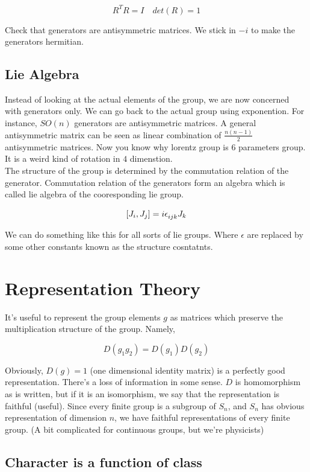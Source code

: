 \documentclass{report}
\begin{document}
$$R^{T}R = I \quad det(R) = 1$$

\noindent Check that generators are antisymmetric matrices. We stick in $-i$ to make the generators hermitian.

\subsection{Lie Algebra}

Instead of looking at the actual elements of the group, we are now concerned with generators only. We can go back to the actual group using exponention. For instance, $SO(n)$ generators are antisymmetric matrices. A general antisymmetric matrix can be seen as linear combination of $\frac{n(n-1)}{2}$ antisymmetric matrices. Now you know why lorentz group is $6$ parameters group. It is a weird kind of rotation in $4$ dimenstion.\\

\noindent The structure of the group is determined by the commutation relation of the generator. Commutation relation of the generators form an algebra which is called lie algebra of the cooresponding lie group.

$$[J_i, J_j] = i\epsilon\indices{_i_j_k}J_k$$

\noindent We can do something like this for all sorts of lie groups. Where $\epsilon$ are replaced by some other constants known as the structure cosntatnts.

\section{Representation Theory}

It's useful to represent the group elements $g$ as matrices which preserve the multiplication structure of the group. Namely,

$$D(g_1 g_2) = D(g_1)D(g_2)$$

\noindent Obviously, $D(g) = 1$ (one dimensional identity matrix) is a perfectly good representation. There's a loss of information in some sense. $D$ is homomorphism as is written, but if it is an isomorphism, we say that the representation is faithful (useful). Since every finite group is a subgroup of $S_n$, and $S_n$ has obvious representation of dimension $n$, we have faithful representations of every finite group. (A bit complicated for continuous groups, but we're physicists)

\subsection{Character is a function of class}
\end{document}
